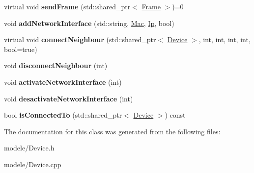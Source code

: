 \begin{DoxyCompactItemize}
\item 
\hypertarget{class_device_aefde9db75e23ba796d43de36d90de256}{virtual void {\bfseries send\-Frame} (std\-::shared\-\_\-ptr$<$ \hyperlink{class_frame}{Frame} $>$)=0}\label{class_device_aefde9db75e23ba796d43de36d90de256}

\item 
\hypertarget{class_device_a0ff5008b5ef8f92d995a2b695d2b68ae}{void {\bfseries add\-Network\-Interface} (std\-::string, \hyperlink{class_mac}{Mac}, \hyperlink{class_ip}{Ip}, bool)}\label{class_device_a0ff5008b5ef8f92d995a2b695d2b68ae}

\item 
\hypertarget{class_device_acfb5932bfd5e17829918873101205851}{virtual void {\bfseries connect\-Neighbour} (std\-::shared\-\_\-ptr$<$ \hyperlink{class_device}{Device} $>$, int, int, int, int, bool=true)}\label{class_device_acfb5932bfd5e17829918873101205851}

\item 
\hypertarget{class_device_ad14f00201ee5993b013b7ec04afbeade}{void {\bfseries disconnect\-Neighbour} (int)}\label{class_device_ad14f00201ee5993b013b7ec04afbeade}

\item 
\hypertarget{class_device_a04b05a432f4e27ced2ed9fecfa135016}{void {\bfseries activate\-Network\-Interface} (int)}\label{class_device_a04b05a432f4e27ced2ed9fecfa135016}

\item 
\hypertarget{class_device_a05d0731595d089c6768bc2638f55d15d}{void {\bfseries desactivate\-Network\-Interface} (int)}\label{class_device_a05d0731595d089c6768bc2638f55d15d}

\item 
\hypertarget{class_device_ac38d6513655fa704f349d4bc9c7d5e59}{bool {\bfseries is\-Connected\-To} (std\-::shared\-\_\-ptr$<$ \hyperlink{class_device}{Device} $>$) const }\label{class_device_ac38d6513655fa704f349d4bc9c7d5e59}

\end{DoxyCompactItemize}


The documentation for this class was generated from the following files\-:\begin{DoxyCompactItemize}
\item 
modele/Device.\-h\item 
modele/Device.\-cpp\end{DoxyCompactItemize}

